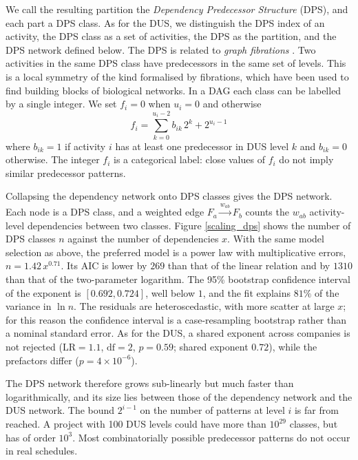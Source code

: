 \documentclass[11pt,a4paper]{article}
\begin{document}
We call the resulting partition the {\em Dependency Predecessor Structure} (DPS), and each part a DPS class. As for the DUS, we distinguish the DPS index of an activity, the DPS class as a set of activities, the DPS as the partition, and the DPS network defined below. The DPS is related to {\em graph fibrations} \cite{boldi2002fibration, morone2020fibrations}. Two activities in the same DPS class have predecessors in the same set of levels. This is a local symmetry of the kind formalised by fibrations, which have been used to find building blocks of biological networks. In a DAG each class can be labelled by a single integer. We set $f_i = 0$ when $u_i = 0$ and otherwise
%
\begin{equation}
f_i= \sum_{k=0}^{u_i - 2} b_{ik}\, 2^{k} + 2^{u_i - 1}
\label{dps_definition}
\end{equation}
%
where $b_{ik}=1$ if activity $i$ has at least one predecessor in DUS level $k$ and $b_{ik}=0$ otherwise. The integer $f_i$ is a categorical label: close values of $f_i$ do not imply similar predecessor patterns.

Collapsing the dependency network onto DPS classes gives the DPS network. Each node is a DPS class, and a weighted edge $F_a \xrightarrow{w_{ab}} F_b$ counts the $w_{ab}$ activity-level dependencies between two classes. Figure \ref{scaling_dps} shows the number of DPS classes $n$ against the number of dependencies $x$. With the same model selection as above, the preferred model is a power law with multiplicative errors, $n = 1.42\,x^{0.71}$. Its AIC is lower by $269$ than that of the linear relation and by $1310$ than that of the two-parameter logarithm. The 95\% bootstrap confidence interval of the exponent is $[0.692, 0.724]$, well below $1$, and the fit explains $81\%$ of the variance in $\ln n$. The residuals are heteroscedastic, with more scatter at large $x$; for this reason the confidence interval is a case-resampling bootstrap rather than a nominal standard error. As for the DUS, a shared exponent across companies is not rejected ($\mathrm{LR} = 1.1$, $\mathrm{df} = 2$, $p = 0.59$; shared exponent $0.72$), while the prefactors differ ($p = 4 \times 10^{-6}$).

The DPS network therefore grows sub-linearly but much faster than logarithmically, and its size lies between those of the dependency network and the DUS network. The bound $2^{i-1}$ on the number of patterns at level $i$ is far from reached. A project with 100 DUS levels could have more than $10^{29}$ classes, but has of order $10^{3}$. Most combinatorially possible predecessor patterns do not occur in real schedules.
\end{document}

